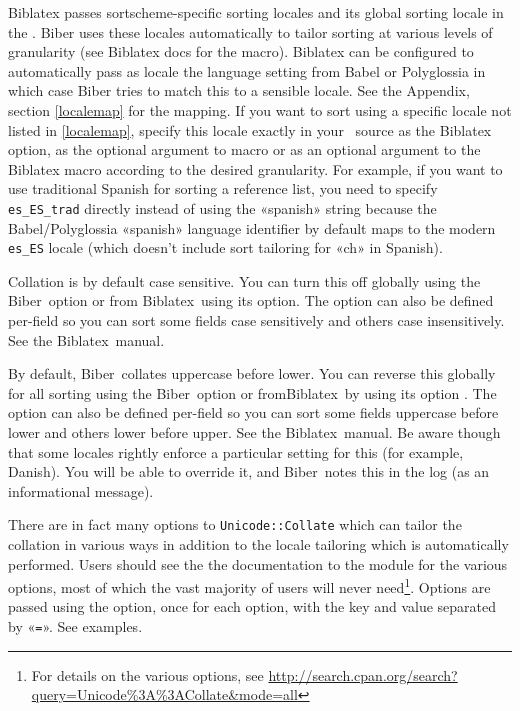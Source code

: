 \documentclass{ltxdockit}
\newcommand*{\biber}{Biber\xspace}
\newcommand*{\biblatex}{Biblatex\xspace}
\begin{document}
\biblatex passes sortscheme-specific sorting locales and its global sorting
locale in the . \biber uses these locales automatically to
tailor sorting at various levels of granularity (see \biblatex docs for the
 macro). \biblatex can be configured to
automatically pass as locale the language setting from Babel or Polyglossia
in which case \biber tries to match this to a sensible locale. See the
Appendix, section \ref{localemap} for the mapping. If you want to sort
using a specific locale not listed in \ref{localemap}, specify this locale
exactly in your \latex\ source as the \biblatex {} option, as
the optional argument to  macro or as an optional
argument to the \biblatex {} macro according to the desired
granularity. For example, if you want to use traditional Spanish for
sorting a reference list, you need to specify \verb+es_ES_trad+ directly
instead of using the «spanish» string because the Babel/Polyglossia
«spanish» language identifier by default maps to the modern \verb+es_ES+
locale (which doesn't include sort tailoring for «ch» in Spanish).

Collation is by default case sensitive. You can turn this
off globally using the \biber\ option  or from
\biblatex\ using its option\linebreak[4]. The option can also
be defined per-field so you can sort some fields case sensitively and
others case insensitively. See the \biblatex\ manual.

By default, \biber\ collates uppercase before lower.
You can reverse this globally for all sorting using the \biber\ option
 or from\linebreak[4]\biblatex\ by using its option
. The option can also be defined per-field so you can
sort some fields uppercase before lower and others lower before upper. See the
\biblatex\ manual. Be aware though that some locales rightly enforce a
particular setting for this (for example, Danish). You will be able to
override it, and \biber\ notes this in the log (as an informational message).

There are in fact many options to \verb+Unicode::Collate+
which can tailor the collation in various ways in
addition to the locale tailoring which is automatically performed.
Users should see the the documentation to the module for the various
options, most of which the vast majority of users will never
need\footnote{For details on the various options, see
  \url{http://search.cpan.org/search?query=Unicode\%3A\%3ACollate&mode=all}}.
Options are passed using the  option, once
for each option, with the key and value separated by «\verb+=+». See
examples.
\end{document}
